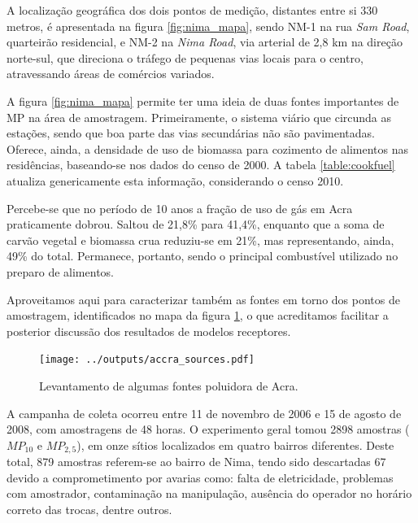A localização geográfica dos dois pontos de medição, distantes entre si 330
metros, é apresentada na figura
\ref{fig:nima_mapa}, sendo NM-1 na rua \textit{Sam Road}, quarteirão residencial,
e NM-2 na \textit{Nima Road}, via arterial de 2,8 km na direção norte-sul, 
que direciona o tráfego de pequenas vias locais para o centro, atravessando áreas de 
comércios variados. 

A figura \ref{fig:nima_mapa} permite ter uma ideia de duas fontes importantes de 
MP na área de amostragem. Primeiramente, o sistema viário que circunda as 
estações, sendo que boa parte das vias secundárias não são pavimentadas. 
Oferece, ainda, a densidade de uso de biomassa para cozimento de alimentos 
nas residências, baseando-se nos dados do censo de 2000. A tabela 
\ref{table:cookfuel} atualiza genericamente esta informação, considerando o 
censo 2010.

Percebe-se que no período de 10 anos a fração de uso de gás em Acra 
praticamente dobrou. Saltou de 21,8\% para 41,4\%, enquanto que a soma de carvão
vegetal e biomassa crua reduziu-se em 21\%, mas representando, ainda, 49\% do 
total. Permanece, portanto, sendo o principal combustível utilizado no preparo 
de alimentos.

Aproveitamos aqui para caracterizar também as fontes em torno dos pontos de
amostragem, identificados no mapa da figura \ref{fg:acrasources}, o que acreditamos facilitar a posterior discussão dos resultados de modelos receptores.

\begin{figure}[H]
  \centering	
  \texttt{[image: ../outputs/accra\_sources.pdf]}
  \caption{Levantamento de algumas fontes poluidora de Acra.
           \label{fg:acrasources}}
\end{figure}

A campanha de coleta ocorreu entre 11 de novembro de 2006 e 15 de agosto de 
2008, com amostragens de 48 horas. O experimento geral tomou 2898 amostras 
($MP_{10}$ e $MP_{2,5}$), em onze sítios localizados em quatro bairros diferentes. 
Deste total, 879 amostras referem-se ao bairro de Nima, tendo sido descartadas 67
devido a comprometimento por avarias como: falta de eletricidade, problemas com 
amostrador, contaminação na manipulação, ausência do operador no horário 
correto das trocas, dentre outros.

%    

